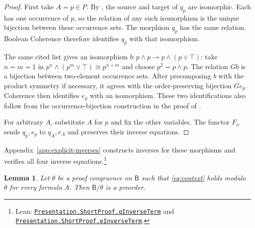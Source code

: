 \documentclass[11pt]{article}
\newtheorem{lemma}[theorem]{Lemma}
\newcommand{\B}{\mathsf B}
\begin{document}
\begin{proof}
First take $A=p\in P$. By \cite[\S12.5, p.~294]{DP}, the source
and target of $q_p$ are isomorphic. Each has one occurrence of $p$,
so the relation of any such isomorphism is the unique bijection
between these occurrence sets. The morphism $q_p$ has the same relation.
Boolean Coherence therefore identifies $q_p$ with that isomorphism.

The same cited list gives an isomorphism
$b:p\wedge p\to p\wedge(p\vee\top)$: take $n=m=1$ in
$p^n\wedge(p^m\vee\top)\cong p^{n+m}$ and choose $p^2=p\wedge p$.
The relation $Gb$ is a bijection between two-element occurrence sets.
After precomposing $b$ with the product symmetry if necessary, it
agrees with the order-preserving bijection $Ge_p$. Coherence then
identifies $e_p$ with an isomorphism. These two identifications also
follow from the occurrence-bijection construction in the proof of
\cite[Lemma~7]{DPIsomorphic}.

For arbitrary $A$, substitute $A$ for $p$ and fix the other variables.
The functor $F_\sigma$ sends $q_p,e_p$ to $q_A,e_A$ and preserves
their inverse equations.
\end{proof}

Appendix~\ref{app:explicit-inverses} constructs inverses for
these morphisms and verifies all four inverse equations.\footnote{\raggedright Lean:
\href{https://github.com/flengyel/Dosen-Petric-Maximality/blob/dosen-petric-v25-palomar-v3/DosenPetric/PresentationShortQ.lean\#L17}{\texttt{Presentation.ShortProof.\allowbreak{}qInverseTerm}} and
\href{https://github.com/flengyel/Dosen-Petric-Maximality/blob/dosen-petric-v25-palomar-v3/DosenPetric/PresentationShortE.lean\#L30}{\texttt{Presentation.ShortProof.\allowbreak{}eInverseTerm}}.}

\begin{lemma}\label{lem:collapse}
Let $\theta$ be a proof congruence on $\B$ such that
\eqref{eq:context} holds modulo $\theta$ for every formula $A$.
Then $\B/\theta$ is a preorder.
\end{lemma}
\end{document}
